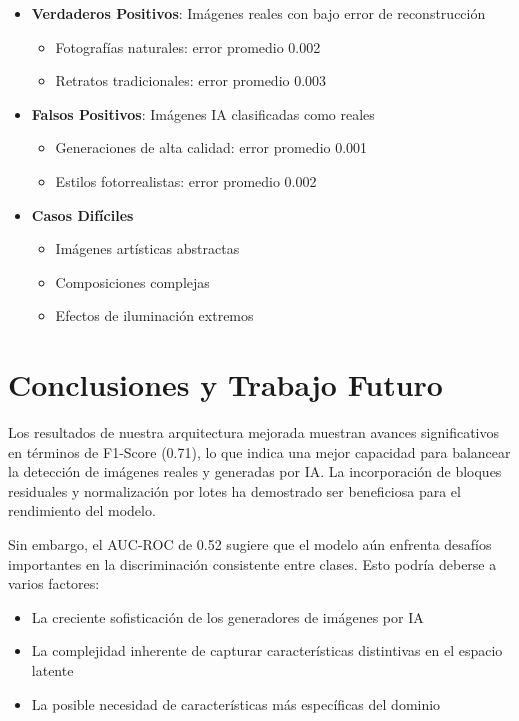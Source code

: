 \documentclass[conference]{IEEEtran}
\begin{document}
\begin{itemize}
    \item \textbf{Verdaderos Positivos}: Imágenes reales con bajo error de reconstrucción
    \begin{itemize}
        \item Fotografías naturales: error promedio 0.002
        \item Retratos tradicionales: error promedio 0.003
    \end{itemize}
    
    \item \textbf{Falsos Positivos}: Imágenes IA clasificadas como reales
    \begin{itemize}
        \item Generaciones de alta calidad: error promedio 0.001
        \item Estilos fotorrealistas: error promedio 0.002
    \end{itemize}
    
    \item \textbf{Casos Difíciles}
    \begin{itemize}
        \item Imágenes artísticas abstractas
        \item Composiciones complejas
        \item Efectos de iluminación extremos
    \end{itemize}
\end{itemize}

\section{Conclusiones y Trabajo Futuro}
Los resultados de nuestra arquitectura mejorada muestran avances significativos en términos de F1-Score (0.71), lo que indica una mejor capacidad para balancear la detección de imágenes reales y generadas por IA. La incorporación de bloques residuales y normalización por lotes ha demostrado ser beneficiosa para el rendimiento del modelo.

Sin embargo, el AUC-ROC de 0.52 sugiere que el modelo aún enfrenta desafíos importantes en la discriminación consistente entre clases. Esto podría deberse a varios factores:

\begin{itemize}
    \item La creciente sofisticación de los generadores de imágenes por IA
    \item La complejidad inherente de capturar características distintivas en el espacio latente
    \item La posible necesidad de características más específicas del dominio
\end{itemize}
\end{document}
